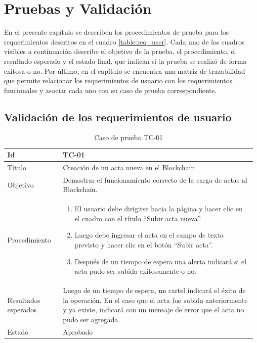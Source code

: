 \chapter{Pruebas y Validación} %
\label{Chapter6}
En el presente capítulo se describen los procedimientos de prueba para los requerimientos descritos en el cuadro \ref{table:req_user}. Cada uno de los cuadros visibles a continuación describe el objetivo de la prueba, el procedimiento, el resultado esperado y el estado final, que indican si la prueba se realizó de forma exitosa o no. Por último, en el capítulo se encuentra una matriz de trazabilidad que permite relacionar los requerimientos de usuario con los requerimientos funcionales y asociar cada uno con su caso de prueba correspondiente.
\section{Validación de los requerimientos de usuario}
\renewcommand{\tabularxcolumn}[1]{>{\arraybackslash}m{#1}}
\begin{table}[H]
    \begin{tabularx}{\textwidth}{|m{3cm}|X|}
    \hline
    Id & TC-01\\
    \hline
    Título & Creación de un acta nueva en el Blockchain \\
    \hline
    Objetivo & Demostrar el funcionamiento correcto de la carga de actas al Blockchain.\\
    \hline
    Procedimiento & \begin{enumerate}
        \item El usuario debe dirigirse hacia la página y hacer clic en el cuadro con el título ``Subir acta nueva''.
        \item Luego debe ingresar el acta en el campo de texto previsto y hacer clic en el botón ``Subir acta''.
        \item Después de un tiempo de espera una alerta indicará si el acta pudo ser subida exitosamente o no.
    \end{enumerate}\\
    \hline
    Resultados esperados & Luego de un tiempo de espera, un cartel indicará el éxito de la operación. En el caso que el acta fue subida anteriormente y ya existe, indicará con un mensaje de error que el acta no pudo ser agregada.\\
    \hline
    Estado & Aprobado\\
    \hline
    \end{tabularx}
    \caption{Caso de prueba TC-01}
\end{table}
